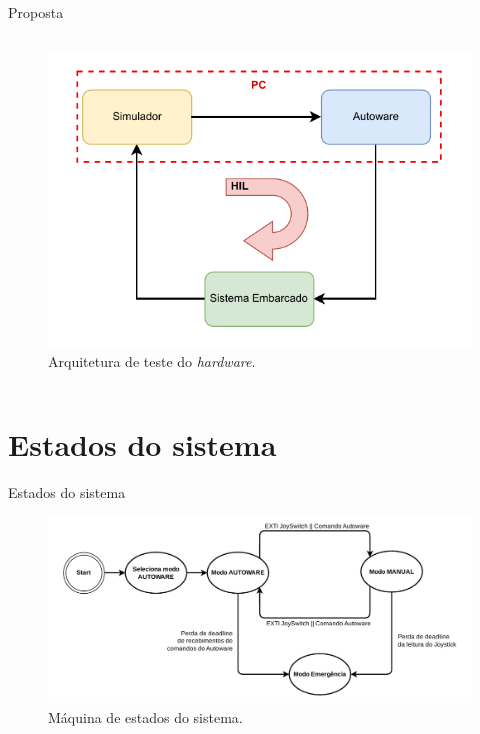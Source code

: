 \documentclass{if-beamer}
\begin{document}
\begin{frame}{Proposta}
\begin{columns}
\begin{column}{0.5\textwidth}
				\begin{figure}[H]
				\centering
				\includegraphics[width=\linewidth]{img/architecture_HIL}
				\caption{Arquitetura de teste do \textit{hardware}.}
				\label{fig:architecture_HIL}
			\end{figure}
			
		\end{column}
		
	\end{columns}
	
\end{frame}

\section{Estados do sistema}

\begin{frame}{Estados do sistema}
	
	
	\begin{figure}[H]
		\centering
		\includegraphics[width = \textwidth]{img/maquinadeestados}
		\caption{Máquina de estados do sistema.}
		\label{fig:maquinadeestados}
	\end{figure}
	
	
\end{frame}
\end{document}
